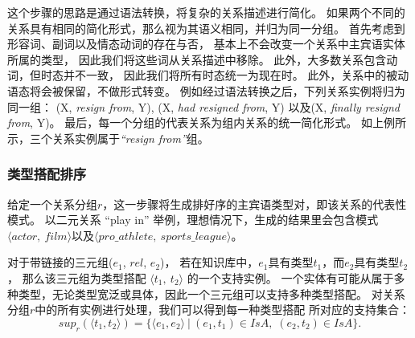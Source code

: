 
这个步骤的思路是通过语法转换，将复杂的关系描述进行简化。
如果两个不同的关系具有相同的简化形式，那么视为其语义相同，并归为同一分组。
首先考虑到形容词、副词以及情态动词的存在与否，
基本上不会改变一个关系中主宾语实体所属的类型，
因此我们将这些词从关系描述中移除。
此外，大多数关系包含动词，但时态并不一致，
因此我们将所有时态统一为现在时。
此外，关系中的被动语态将会被保留，不做形式转变。
例如经过语法转换之后，下列关系实例将归为同一组：
(X, \textit{resign from}, Y), (X, \textit{had resigned from}, Y)
以及(X, \textit{finally resignd from}, Y)。
最后，每一个分组的代表关系为组内关系的统一简化形式。
如上例所示，三个关系实例属于\textit{``resign from''}组。


\subsubsection{类型搭配排序}
\label{sec:tinf-approach-sort}

给定一个关系分组$r$，这一步骤将生成排好序的主宾语类型对，即该关系的代表性模式。
以二元关系 ``play in'' 举例，理想情况下，生成的结果里会包含模式
$\langle actor,\ film \rangle$以及$\langle pro\_athlete,\ sports\_league \rangle$。

对于带链接的三元组($e_1$, $rel$, $e_2$)，
若在知识库中，$e_1$具有类型$t_1$，而$e_2$具有类型$t_2$，
那么该三元组为类型搭配 $\langle t_1,\ t_2 \rangle$ 的一个支持实例。
一个实体有可能从属于多种类型，无论类型宽泛或具体，因此一个三元组可以支持多种类型搭配。
对关系分组$r$中的所有实例进行处理，我们可以得到每一种类型搭配
所对应的支持集合：
\begin{equation}
sup_{r}(\langle t_1, t_2 \rangle) = \{ \langle e_1, e_2 \rangle\ |\ (e_1, t_1) \in IsA,\; (e_2, t_2) \in IsA \}.
\end{equation}

